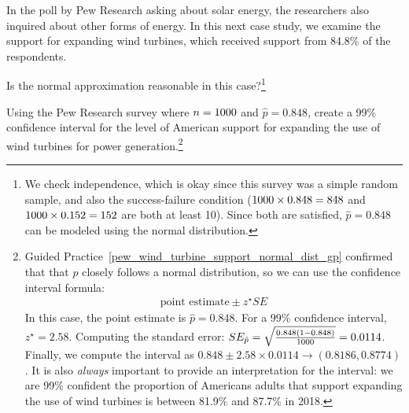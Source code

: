 
\newcommand{\pewwindpollsize}{\pewsolarpollsize}
\newcommand{\pewwindpollprop}{0.848}
\newcommand{\pewwindpollpropcomplement}{0.152}
\newcommand{\pewwindpollpercent}{84.8}
\newcommand{\pewwindpollpercentcomplement}{15.2}
\newcommand{\pewwindpollcount}{848}
\newcommand{\pewwindpollcountcomplement}{152}
\newcommand{\pewwindpollse}{0.0114}

In the poll by Pew Research asking about solar energy, the
researchers also inquired about other forms of energy.
In this next case study, we examine the support for expanding wind
turbines, which received support from \pewwindpollpercent{}\%
of the \pewwindpollsize{} respondents.

\begin{exercise}\label{pew_wind_turbine_support_normal_dist_gp}
Is the normal approximation reasonable in this case?\footnote{We
check independence, which is okay since this survey was a simple
random sample, and also the success-failure condition
($\pewwindpollsize{} \times \pewwindpollprop{} = \pewwindpollcount{}$
and $\pewwindpollsize{} \times \pewwindpollpropcomplement{}
    = \pewwindpollcountcomplement$ are both at least 10).
Since both are satisfied, $\hat{p} = \pewwindpollprop{}$ can be
modeled using the normal distribution.}
\end{exercise}

\begin{exercise}
Using the Pew Research survey where $n = \pewwindpollsize{}$ and
$\hat{p} = \pewwindpollprop{}$, create a 99\% confidence interval
for the level of American support for expanding the use of wind
turbines for power
generation.\footnote{Guided
Practice~\ref{pew_wind_turbine_support_normal_dist_gp}
confirmed that that $\hat{p}$ closely follows a normal distribution,
so we can use the confidence interval formula:
\begin{align*}
\text{point estimate} \pm z^{\star} SE
\end{align*}
In this case, the point estimate is $\hat{p} = \pewwindpollprop{}$.
For a 99\% confidence interval, $z^{\star} = 2.58$. Computing the
standard error:
$SE_{\hat{p}}
  = \sqrt{\frac{\pewwindpollprop{}(1 - \pewwindpollprop{})}
      {\pewwindpollsize{}}}
  = \pewwindpollse{}$.
Finally, we compute the interval as
$\pewwindpollprop{} \pm 2.58 \times \pewwindpollse{} \to (0.8186, 0.8774)$.
It is also \emph{always} important to provide an interpretation for
the interval: we are 99\% confident the proportion of
Americans adults that support expanding the use of wind
turbines is between 81.9\% and 87.7\% in 2018.}
\end{exercise}




